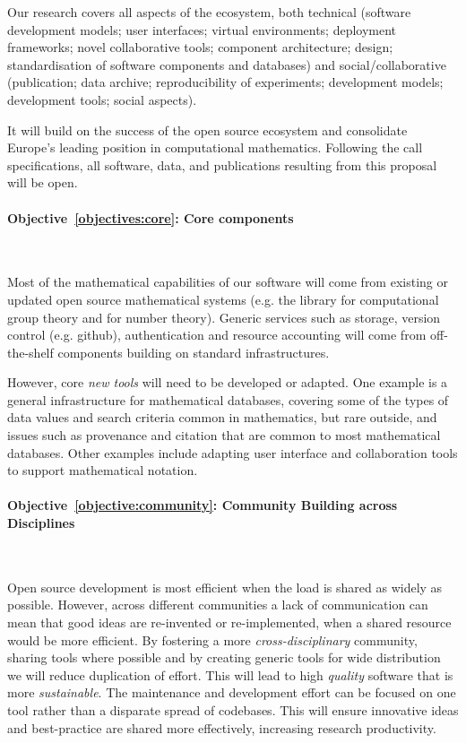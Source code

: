 \documentclass[noworkareas,deliverables,\classoptions]{euproposal}       %
\begin{document}
\begin{proposal}
Our research covers all aspects of the ecosystem, both technical
(software development models; user
    interfaces; virtual environments; deployment frameworks; novel
    collaborative tools; component architecture; design;
    standardisation of software components and databases)
and social/collaborative
(publication; data archive; reproducibility of experiments;
development models; development tools; social aspects).

It will build on the success of the open source ecosystem and
consolidate Europe's leading position in computational mathematics.
Following the call specifications, all software, data, and
publications resulting from this proposal will be open.

\paragraph{Objective~\ref{objectives:core}: Core components}\

Most of the mathematical capabilities of our software will come
from existing or updated open source mathematical systems (e.g. the
\GAP library for computational group theory and \PariGP for number
theory). Generic services such as storage, version control
(e.g. github), authentication and resource accounting will come from
off-the-shelf components building on standard infrastructures.

However, core \emph{new tools} will need to be developed or
adapted. One example is a general infrastructure for mathematical
databases, covering some of the types of data values and search
criteria common in mathematics, but rare outside, and issues such as
provenance and citation that are common to most mathematical
databases. Other examples include adapting user interface and
collaboration tools to support mathematical notation.

\paragraph{Objective~\ref{objective:community}: Community Building across Disciplines}\

Open source development is most efficient when the load is shared as
widely as possible. However, across different communities a lack of
communication can mean that good ideas are re-invented or
re-implemented, when a shared resource would be more efficient. By
fostering a more \emph{cross-disciplinary} community, sharing tools
where possible and by creating generic tools for wide distribution we
will reduce duplication of effort. This will lead to high
\emph{quality} software that is more \emph{sustainable}. The
maintenance and development effort can be focused on one tool rather
than a disparate spread of codebases. This will ensure innovative
ideas and best-practice are shared more effectively, increasing
research productivity.


\end{proposal}
\end{document}
